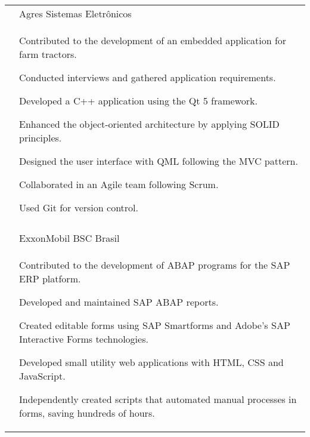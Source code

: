 \documentclass[a4paper,12pt]{article}
\begin{document}
\begin{longtable}{r|p{14.3cm}}
 & \large{Agres Sistemas Eletrônicos} \\*
 &\small{
    \begin{itemize*}[label=\Large\textbullet]
        \item Contributed to the development of an embedded application for farm tractors.
        \item \mbox{Conducted} interviews and gathered application requirements.
        \item Developed a \mbox{C++} \mbox{application} using the Qt 5 framework.
        \item Enhanced the object-oriented architecture by \mbox{applying} SOLID principles.
        \item Designed the user interface with QML following the MVC pattern.
        \item Collaborated in an Agile team following Scrum.
        \item Used Git for version control.
    \end{itemize*}
}
 \\ \\

& \large{ExxonMobil BSC Brasil}\\*
&\small{
    \begin{itemize*}[label=\Large\textbullet]
        \item Contributed to the development of ABAP programs for the SAP ERP platform.
        \item Developed and maintained SAP ABAP reports.
        \item Created editable forms using SAP Smartforms and Adobe's SAP Interactive Forms technologies.
        \item Developed small utility web applications with HTML, CSS and JavaScript.
        \item Independently created scripts that automated manual processes in forms, saving hundreds of hours.
    \end{itemize*}
}
\end{longtable}
\end{document}
